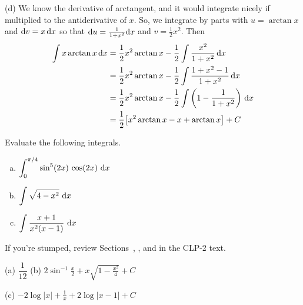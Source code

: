 \begin{solution}
\noindent (d)
We know the derivative of arctangent, and it would integrate nicely if multiplied to the antiderivative of $x$. So, we
integrate by parts with $u=\arctan x$ and $\mathrm{d}v=x\,\mathrm{d}x$ so that
$\mathrm{d}u=\frac{1}{1+x^2}\mathrm{d}x$ and $v=\frac{1}{2} x^2$. Then
\begin{align*}
\int x\arctan  x\,\mathrm{d}x&= \frac{1}{2} x^2\arctan  x
               -\frac{1}{2}\int \frac{x^2}{1+x^2}\,\mathrm{d}x \\
&= \frac{1}{2} x^2\arctan  x-\frac{1}{2}\int \frac{1+x^2-1}{1+x^2}\,\mathrm{d}x\cr
&= \frac{1}{2} x^2\arctan  x-\frac{1}{2}\int \left(1-\frac{1}{1+x^2}\right)\,\mathrm{d}x\cr
&=\frac{1}{2}\big[ x^2\arctan  x -x +\arctan x\big]+C
\end{align*}



\end{solution}

\begin{question}[M121 2000A]
Evaluate the following integrals.
\begin{enumerate}[(a)]
\item
$\displaystyle\int_0^{\pi/4}\sin^5(2x)\,\cos(2x)\ \dee{x}$
\item
$\displaystyle\int\sqrt{4-x^2}\ \dee{x}$
\item
$\displaystyle\int\frac{x+1}{x^2(x-1)}\ \dee{x}$
\end{enumerate}
\end{question}

\begin{hint}
If you're stumped, review Sections~,
,
and
 in the CLP-2 text.
\end{hint}

\begin{answer} (a)
$\dfrac{1}{12}$
\qquad (b)
$\displaystyle2\sin^{-1}\frac{x}{2}+x\sqrt{1-\frac{x^2}{4}}+C$

\noindent (c)
$\displaystyle-2\log|x|+\frac{1}{x}+2\log|x-1|+C$
\end{answer}

